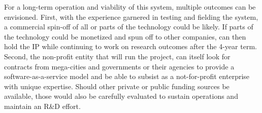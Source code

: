 




For a long-term operation and viability of this system, multiple
outcomes can be envisioned. First, with the experience garnered in
testing and fielding the system, a commercial spin-off of all or parts
of the technology could be likely. If parts of the technology could be
monetized and spun off to other companies, \pro can then hold the IP
while continuing to work on research outcomes after the 4-year
term. Second, the non-profit entity that will run the project, can
itself look for contracts from mega-cities and governments or their
agencies to provide a software-as-a-service model and be able to
subsist as a not-for-profit enterprise with unique expertise. Should
other private or public funding sources be available, those would also
be carefully evaluated to sustain operations and maintain an R\&D
effort.
